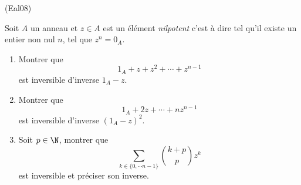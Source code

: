\begin{tiny}(Eal08)\end{tiny} Soit $A$ un anneau et $z\in A$ est un élément \emph{nilpotent} c'est à dire tel qu'il existe un entier non nul $n$,  tel que $z^n=0_A$.\begin{enumerate}
\item Montrer que
\begin{displaymath}
 1_A+z+z^2 +\cdots + z^{n-1}
\end{displaymath}
est inversible d'inverse $1_A-z$.
 \item Montrer que
\begin{displaymath}
1_A + 2z+ \cdots +nz^{n-1} 
\end{displaymath}
est inversible d'inverse $(1_A-z)^2$.
\item Soit $p\in \N$, montrer que
\begin{displaymath}
\sum_{k\in\{0,\cdots n-1\}}\binom{k+p}{p}z^k 
\end{displaymath}
est inversible et préciser son inverse.
\end{enumerate}
